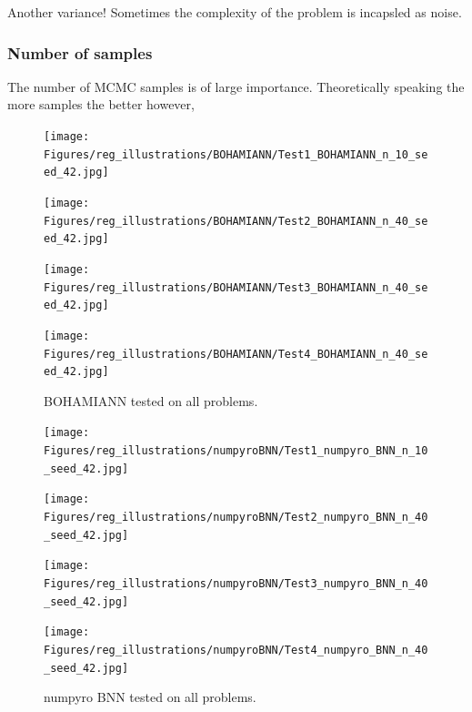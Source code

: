 Another variance! Sometimes the complexity of the problem is incapsled as noise.


\subsubsection{Number of samples}
The number of MCMC samples is of large importance. Theoretically speaking the more samples the better
however, 


\begin{figure}[h]
    \centering
    \begin{minipage}[b]{0.49\textwidth}
     \texttt{[image: Figures/reg\_illustrations/BOHAMIANN/Test1\_BOHAMIANN\_n\_10\_seed\_42.jpg]}
    \end{minipage}
    \hfill
    \begin{minipage}[b]{0.49\textwidth}
      \texttt{[image: Figures/reg\_illustrations/BOHAMIANN/Test2\_BOHAMIANN\_n\_40\_seed\_42.jpg]}
     \end{minipage}
    
     \begin{minipage}[b]{0.49\textwidth}
      \texttt{[image: Figures/reg\_illustrations/BOHAMIANN/Test3\_BOHAMIANN\_n\_40\_seed\_42.jpg]}
     \end{minipage}
     \hfill
     \begin{minipage}[b]{0.49\textwidth}
       \texttt{[image: Figures/reg\_illustrations/BOHAMIANN/Test4\_BOHAMIANN\_n\_40\_seed\_42.jpg]}
      \end{minipage}
      \caption{BOHAMIANN tested on all problems.}
\end{figure}


\begin{figure}[h]
    \centering
    \begin{minipage}[b]{0.49\textwidth}
     \texttt{[image: Figures/reg\_illustrations/numpyroBNN/Test1\_numpyro\_BNN\_n\_10\_seed\_42.jpg]}
    \end{minipage}
    \hfill
    \begin{minipage}[b]{0.49\textwidth}
      \texttt{[image: Figures/reg\_illustrations/numpyroBNN/Test2\_numpyro\_BNN\_n\_40\_seed\_42.jpg]}
     \end{minipage}
    
     \begin{minipage}[b]{0.49\textwidth}
      \texttt{[image: Figures/reg\_illustrations/numpyroBNN/Test3\_numpyro\_BNN\_n\_40\_seed\_42.jpg]}
     \end{minipage}
     \hfill
     \begin{minipage}[b]{0.49\textwidth}
       \texttt{[image: Figures/reg\_illustrations/numpyroBNN/Test4\_numpyro\_BNN\_n\_40\_seed\_42.jpg]}
      \end{minipage}
      \caption{numpyro BNN tested on all problems.}
\end{figure}